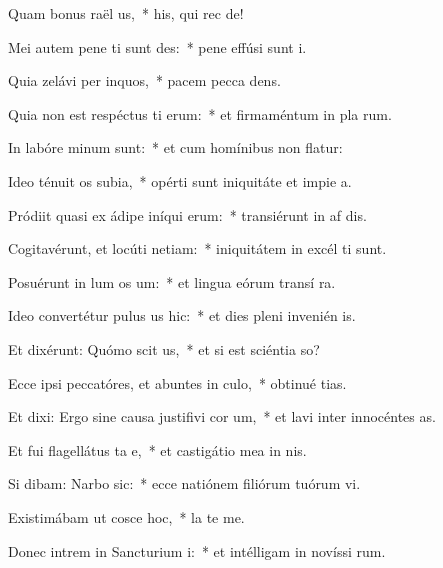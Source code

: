 \item Quam bonus raël us,~* his, qui rec  de!
\item Mei autem pene ti sunt des:~* pene effúsi sunt  i.
\item Quia zelávi per inquos,~* pacem pecca dens.
\item Quia non est respéctus ti erum:~* et firmaméntum in pla rum.
\item In labóre minum  sunt:~* et cum homínibus non flatur:
\item Ideo ténuit os subia,~* opérti sunt iniquitáte et impie a.
\item Pródiit quasi ex ádipe iníqui erum:~* transiérunt in af dis.
\item Cogitavérunt, et locúti  netiam:~* iniquitátem in excél ti sunt.
\item Posuérunt in lum os um:~* et lingua eórum transí  ra.
\item Ideo convertétur pulus us hic:~* et dies pleni invenién  is.
\item Et dixérunt: Quómo scit us,~* et si est sciéntia  so?
\item Ecce ipsi peccatóres, et abuntes in culo,~* obtinué tias.
\item Et dixi: Ergo sine causa justifivi cor um,~* et lavi inter innocéntes  as.
\item Et fui flagellátus ta e,~* et castigátio mea in nis.
\item Si dibam: Narbo sic:~* ecce natiónem filiórum tuórum vi.
\item Existimábam ut cosce hoc,~* la  te me.
\item Donec intrem in Sancturium i:~* et intélligam in novíssi rum.
